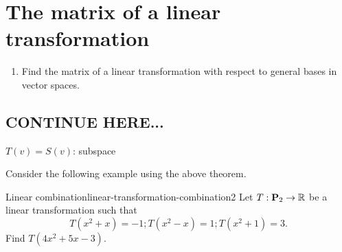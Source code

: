 \section{The matrix of a linear transformation}

\begin{outcome}
  \begin{enumerate}
  \item Find the matrix of a linear transformation with respect to
    general bases in vector spaces.
  \end{enumerate}
\end{outcome}


\subsection{CONTINUE HERE...}

$T(v) = S(v)$: subspace

Consider the following example using the above theorem.

\begin{example}{Linear combination}{linear-transformation-combination2}
  Let $T:\mathbf{P}_2 \to \mathbb{R}$ be a linear transformation such that
  \begin{equation*}
    T(x^2+x)=-1; T(x^2-x)=1; T(x^2+1)=3.
  \end{equation*}
  Find $T(4x^2+5x-3)$.
\end{example}

